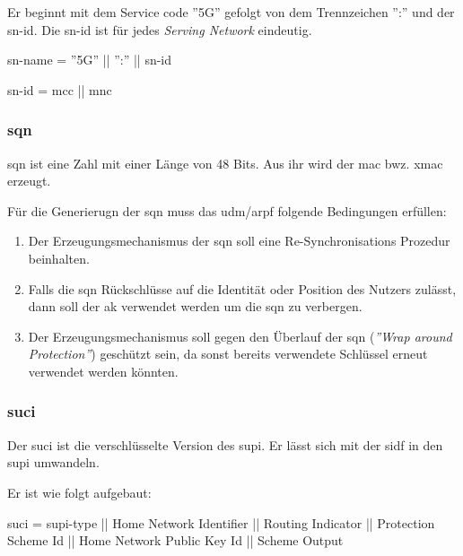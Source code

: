 Er beginnt mit dem Service code ''5G'' gefolgt von dem Trennzeichen '':'' und der \gls{sn-id}.
Die \gls{sn-id} ist f\"ur jedes \textit{Serving Network} eindeutig.

\gls{sn-name} = ''5G'' || '':'' || \gls{sn-id}

\gls{sn-id} = \gls{mcc} || \gls{mnc}

\subsubsection{\gls{sqn}}
\gls{sqn} ist eine Zahl mit einer L\"ange von 48 Bits. %
Aus ihr wird der \gls{mac} bwz. \gls{xmac} erzeugt. %

F\"ur die Generierugn der \gls{sqn} muss das \gls{udm}/\gls{arpf} folgende Bedingungen erf\"ullen:\\%
\begin{enumerate}
\item Der Erzeugungsmechanismus der \gls{sqn} soll eine Re-Synchronisations Prozedur beinhalten.\\
\item Falls die \gls{sqn} R\"uckschl\"usse auf die Identit\"at oder Position des Nutzers zul\"asst, dann soll der \gls{ak} verwendet werden um die \gls{sqn} zu verbergen.\\
\item Der Erzeugungsmechanismus soll gegen den \"Uberlauf der \gls{sqn} (\textit{''Wrap around Protection''}) gesch\"utzt sein, da sonst bereits verwendete Schl\"ussel erneut verwendet werden k\"onnten. 
\end{enumerate}

\subsubsection{\gls{suci}}
Der \gls{suci} ist die verschl\"usselte Version des \gls{supi}.
Er l\"asst sich mit der \gls{sidf} in den \gls{supi} umwandeln.

Er ist wie folgt aufgebaut: %

\gls{suci} = \gls{supi-type} || Home Network Identifier || Routing Indicator || Protection Scheme Id || Home Network Public Key Id || Scheme Output

